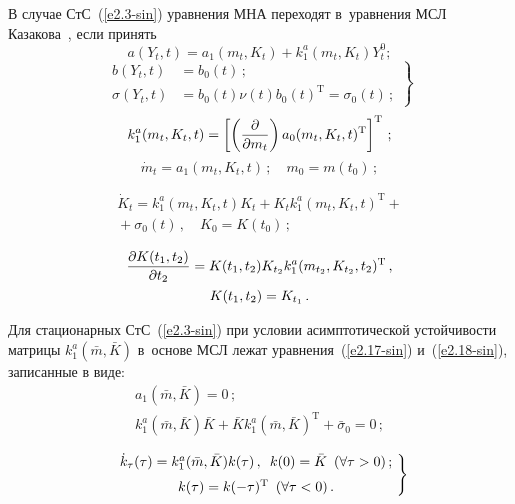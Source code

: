 \begin{multicols}{2}
В случае СтС~(\ref{e2.3-sin}) уравнения МНА переходят в~уравнения МСЛ
Казакова~\cite{2-sin, 3-sin}, если принять
\begin{equation}
a(Y_t,t) = a_1 (m_t, K_t) + k_1^a (m_t, K_t) Y_t^0;\label{e2.19-sin}
\end{equation}
\begin{equation}
\left.
\begin{array}{rl}
b(Y_t,t) &= b_0 (t)\,;\\[6pt]
\sigma(Y_t, t)&= b_0(t) \nu(t) b_0(t)^{\mathrm{T}} =
\sigma_0(t)\,;
\end{array}
\right\}
\label{e2.20-sin}
\end{equation}
\begin{equation}
k_1^a (m_t, K_t, t) =\left[ \left(\displaystyle\frac{\displaystyle \partial\mathstrut}{\displaystyle \partial m_t\mathstrut} \right)a_0 (m_t, K_t, t)^{\mathrm{T}}\right]^{\mathrm{T}}\,;\label{e2.21-sin}
\end{equation}
\begin{equation}
\dot m_t = a_1 (m_t, K_t, t) \,;\quad m_0 = m(t_0)\,;\label{e2.22-sin}
\end{equation}
\vspace*{-12pt}

\noindent
\begin{multline}
\dot K_t = k_1^a (m_t, K_t, t) K_t + K_t k_1^a (m_t, K_t, t)^{\mathrm{T}} +{}\\
{}+\sigma_0(t)\,,\quad K_0 = K(t_0)\,;
\label{e2.23-sin}
\end{multline}

\vspace*{-12pt}

\noindent
\begin{multline}
\displaystyle\frac{\displaystyle \partial K(t_1, t_2)\mathstrut}{\displaystyle \partial t_2\mathstrut} = K(t_1, t_2) K_{t_2} k_1^a
(m_{t_2}, K_{t_2}, t_2)^{\mathrm{T}}\,,\\
K(t_1, t_2) = K_{t_1}\,.
\label{e2.24-sin}
\end{multline}


Для стационарных СтС~(\ref{e2.3-sin}) при условии асимптотической устойчивости
матрицы $k_1^a (\bar m, \bar K)$ в~основе МСЛ лежат уравнения~(\ref{e2.17-sin})
и~(\ref{e2.18-sin}), записанные в виде:
\begin{gather}
a_1 (\bar m, \bar K) =0\,; \label{e2.25-sin}\\
k_1^a (\bar m, \bar K) \bar K + \bar K k_1^a (\bar m, \bar K)^{\mathrm{T}} +\bar \sigma_0 =0\,;\label{e2.26-sin}
\end{gather}

\noindent
\begin{equation}
\left.
\begin{array}{c}
\!\dot k_\tau (\tau) = k_1^a (\bar m, \bar K)k(\tau)\,,\enskip
k(0) =\bar K \enskip (\forall \tau >0)\,;\\[6pt]
\!k(\tau) = k (-\tau)^{\mathrm{T}} \enskip (\forall \tau <0)\,.
\end{array}\!
\right\}\!
\label{e2.27-sin}
\end{equation}


\end{multicols}
